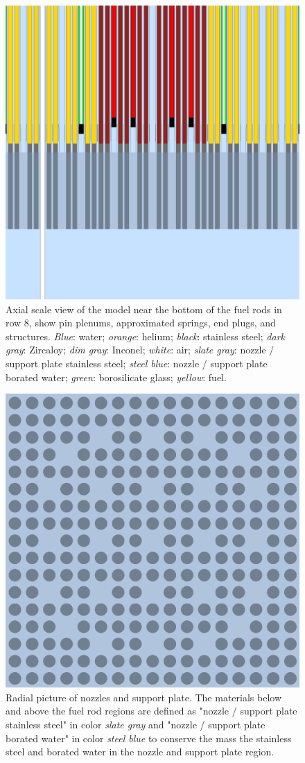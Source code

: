 \documentclass{article}
\begin{document}
\begin{figure}[ht]
\centering
\includegraphics[keepaspectratio, width = 2.5 in]{figures/axial_mats_row_8_botzoom}
\caption{Axial scale view of the model near the bottom of the fuel rods in row 8, show pin plenums, approximated springs, end plugs, and structures. \emph{Blue}: water; \emph{orange}: helium;  \emph{black}: stainless steel; \emph{dark gray}: Zircaloy; \emph{dim gray}: Inconel; \emph{white}: air; \emph{slate gray}: nozzle / support plate stainless steel; \emph{steel blue}: nozzle / support plate borated water; \emph{green}: borosilicate glass; \emph{yellow}: fuel.}
\label{fig:bot_core_zoom}
\end{figure}
\FloatBarrier

\begin{figure}[ht]
\centering
\includegraphics[keepaspectratio, width = 2.5 in]{figures/J8_nozzle}
\caption{Radial picture of nozzles and support plate. The materials below and above the fuel rod regions are defined as "nozzle / support plate stainless steel" in color \emph{slate gray} and "nozzle / support plate borated water" in color \emph{steel blue} to conserve the mass the stainless steel and borated water in the nozzle and support plate region.}
\label{fig:nozzle}
\end{figure}
\FloatBarrier
\end{document}
